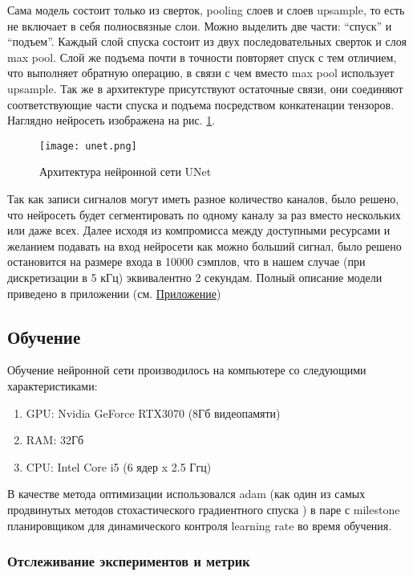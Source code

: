 Сама модель состоит только из сверток, pooling слоев и слоев upsample, то есть
не включает в себя полносвязные слои. Можно выделить две части: ``спуск'' и
``подъем''. Каждый слой спуска состоит из двух последовательных сверток и слоя
max pool. Слой же подъема почти в точности повторяет спуск с тем отличием, что
выполняет обратную операцию, в связи с чем вместо max pool использует upsample.
Так же в архитектуре присутствуют остаточные связи, они соединяют
соответствующие части спуска и подъема посредством конкатенации тензоров.
Наглядно нейросеть изображена на рис. \ref{fig:unet}.

\begin{figure}[!htb]
	\centering
	\caption{Архитектура нейронной сети UNet}
	\texttt{[image: unet.png]}
	\label{fig:unet}
\end{figure}

Так как записи сигналов могут иметь разное количество каналов, было решено, что
нейросеть будет сегментировать по одному каналу за раз вместо нескольких или
даже всех. Далее исходя из компромисса между доступными ресурсами и желанием
подавать на вход нейросети как можно больший сигнал, было решено остановится на
размере входа в 10000 сэмплов, что в нашем случае (при дискретизации в 5 кГц)
эквивалентно 2 секундам. Полный описание модели приведено в приложении (см.
\hyperref[lst:unet]{Приложение})

\subsection{Обучение}

Обучение нейронной сети производилось на компьютере со следующими характеристиками:

\begin{enumerate}
	\item GPU: Nvidia GeForce RTX3070 (8Гб видеопамяти)
	\item RAM: 32Гб
	\item CPU: Intel Core i5 (6 ядер x 2.5 Ггц)
\end{enumerate}

В качестве метода оптимизации использовался adam (как один из самых продвинутых
методов стохастического градиентного спуска \cite{adam}) в паре с milestone
планировщиком для динамического контроля learning rate во время обучения.

\subsubsection{Отслеживание экспериментов и метрик}

